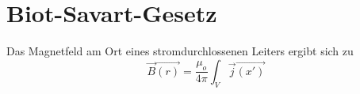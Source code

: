 \documentclass {scrartcl}
\begin{document}
\section{Biot-Savart-Gesetz}
Das Magnetfeld  am Ort  eines stromdurchlossenen Leiters
 ergibt sich zu
  \begin{equation}
    \vec{B}
    \vec{(r)}
    =
    \frac{\mu_o}{4\pi}
    \int_V
    \vec{j}
    \vec{(x')}

  \end{equation}
\end{document}
